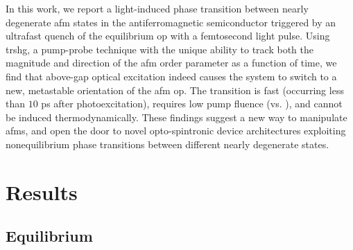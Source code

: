 In this work, we report a light-induced phase transition between nearly degenerate \gls{afm} states in the antiferromagnetic semiconductor \cmb \citep{gibson_magnetic_2015} triggered by an ultrafast quench of the equilibrium \gls{op} with a femtosecond light pulse.
Using \gls{trshg}, a pump-probe technique with the unique ability to track both the magnitude and direction of the \gls{afm} order parameter as a function of time, we find that above-gap optical excitation indeed causes the system to switch to a new, metastable orientation of the \gls{afm} \gls{op}.
The transition is fast (occurring less than $10$ \si{ps} after photoexcitation), requires low pump fluence (\threshold vs. \previousthreshold\citep{afanasiev_ultrafast_2021}), and cannot be induced thermodynamically.
These findings suggest a new way to manipulate \glspl{afm}, and open the door to novel opto-spintronic device architectures exploiting nonequilibrium phase transitions between different nearly degenerate states. 

\section{Results}

\subsection{Equilibrium}


